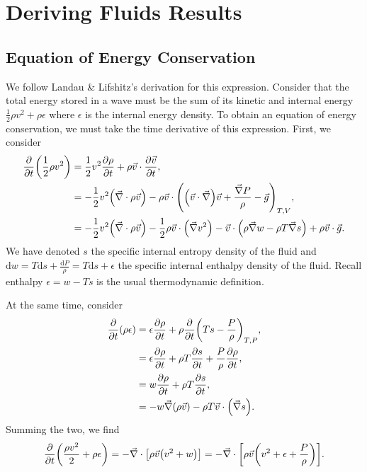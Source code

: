 \documentclass[11pt,
        usenames, %
        dvipsnames %
    ]{report}
\newcommand*{\pd}[2]{\frac{\partial#1}{\partial#2}}
\DeclarePairedDelimiter\p{\lparen}{\rparen}
\DeclarePairedDelimiter\s{\lbrack}{\rbrack}
\begin{document}
\clearpage

\appendix

\chapter{Deriving Fluids Results}

\section{Equation of Energy Conservation}

We follow Landau \& Lifshitz's derivation for this expression. Consider that the
total energy stored in a wave must be the sum of its kinetic and internal energy
$\frac{1}{2}\rho v^2 + \rho \epsilon$ where $\epsilon$ is the internal energy
density. To obtain an equation of energy conservation, we must take the time
derivative of this expression. First, we consider
\begin{align}
    \pd{}{t}\p*{\frac{1}{2}\rho v^2} &= \frac{1}{2}v^2\pd{\rho}{t}
        + \rho \vec{v} \cdot \pd{\vec{v}}{t},\nonumber\\
        &= -\frac{1}{2}v^2 \p*{\vec{\nabla} \cdot \rho \vec{v}}
            - \rho \vec{v} \cdot \p*{
                \p*{\vec{v} \cdot \vec{\nabla}}\vec{v} +
                    \frac{\vec{\nabla}P}{\rho} - \vec{g}
            }_{T, V},\nonumber\\
        &= -\frac{1}{2} v^2 \p*{\vec{\nabla} \cdot \rho \vec{v}}
            - \frac{1}{2}\rho \vec{v} \cdot \p*{\vec{\nabla} v^2}
            - \vec{v} \cdot \p*{
                \rho \vec{\nabla} w - \rho T \vec{\nabla}s
            } + \rho \vec{v} \cdot \vec{g}.
\end{align}
We have denoted $s$ the specific internal entropy density of the fluid and
$\mathrm{d}w = T\mathrm{d}s + \frac{\mathrm{d}P}{\rho} = T\mathrm{d}s +
\epsilon$ the specific internal enthalpy density of the fluid.
Recall enthalpy $\epsilon = w - Ts$ is the usual thermodynamic definition.

At the same time, consider
\begin{align}
    \pd{}{t}\p*{\rho \epsilon} &= \epsilon \pd{\rho}{t}
        + \rho \pd{}{t}\p*{Ts - \frac{P}{\rho}}_{T, P},\nonumber\\
        &= \epsilon \pd{\rho}{t} + \rho T \pd{s}{t} + \frac{P}{\rho}\pd{\rho}{t}
            ,\nonumber\\
        &= w \pd{\rho}{t} + \rho T \pd{s}{t},\nonumber\\
        &= -w\vec{\nabla}\p*{\rho \vec{v}} - \rho T \vec{v} \cdot \p*{
            \vec{\nabla}s
        }.
\end{align}
Summing the two, we find
\begin{equation}
    \pd{}{t}\p*{\frac{\rho v^2}{2} + \rho \epsilon}
        = -\vec{\nabla} \cdot \s*{
            \rho \vec{v}\p*{v^2 + w}
        } = -\vec{\nabla} \cdot \s*{
            \rho \vec{v}\p*{v^2 + \epsilon + \frac{P}{\rho}}
        }.
\end{equation}
\end{document}
